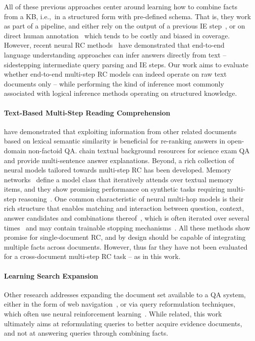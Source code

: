 \documentclass[11pt,letterpaper]{article}
\begin{document}
All of these previous approaches center around learning how to combine facts from a KB, i.e.,\ in a structured form with pre-defined schema.
That is, they work as part of a pipeline, and either rely on the output of a previous IE step~\cite{Banko2008_OpenIE}, or on direct human annotation~\cite{Bollacker2008:FB} which tends to be costly and biased in coverage.
However, recent neural RC methods~\cite{Seo2016BidAF,Shen_2017_ReasoNet} have demonstrated that end-to-end language understanding approaches can infer answers directly from text -- sidestepping intermediate query parsing and IE steps.
Our work aims to evaluate whether end-to-end multi-step RC models can indeed operate on raw text documents only -- while performing the kind of inference most commonly associated with logical inference methods operating on structured knowledge.


\paragraph{Text-Based Multi-Step Reading Comprehension}
 have demonstrated that exploiting information from other related documents based on lexical semantic similarity is beneficial for re-ranking answers in open-domain non-factoid QA.
 chain textual background resources for science exam QA and provide multi-sentence answer explanations.
Beyond, a rich collection of neural models tailored towards multi-step RC has been developed.
Memory networks~\cite{weston_2014_memory,sukhbaatar_2015_N2N_MNN,Kumar2016_ICML} define a model class that iteratively attends over textual memory items, and they show promising performance on synthetic tasks requiring multi-step reasoning~\cite{Weston2015_bAbI}.
One common characteristic of neural multi-hop models is their rich structure that enables matching and interaction between question, context, answer candidates and combinations thereof~\cite{Peng2015_NN__Reasoning,Weissenborn_2016_Separating,Xiong_2016_Dynamic_coattention,Gated_memNN_Liu_2017}, which is often iterated over several times~\cite{Sordoni2016IterativeAN,neumann2016learning,Seo2017QRN,Hu_2917_Mnemonic} and may contain trainable stopping mechanisms~\cite{Graves_2016_Adaptive,Shen_2017_ReasoNet}.
All these methods show promise for single-document RC, and by design should be capable of integrating multiple facts across documents.
However, thus far they have not been evaluated for a cross-document multi-step RC task -- as in this work.


\paragraph{Learning Search Expansion}
Other research addresses expanding the document set available to a QA system, either in the form of web navigation~\cite{Nogueira_2016_WebNav}, or via query reformulation techniques, which often use neural reinforcement learning~\cite{Narasimhan_2016_Improving,Nogueira_2017_Query_Reformulation,Buck_2017_Ask}.
While related, this work ultimately aims at reformulating queries to better acquire evidence documents, and not at answering queries through combining facts.
\end{document}

